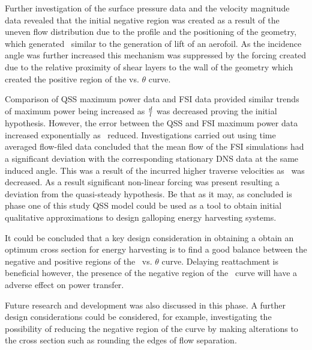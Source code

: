 Further investigation of the surface pressure data and the velocity magnitude data revealed that the initial negative region was created as a result of the uneven flow distribution due to the profile and the positioning of the geometry, which generated \cy\ similar to the generation of lift of an aerofoil. As the incidence angle was further increased this mechanism was suppressed by the forcing created due to the relative proximity of shear layers to the wall of the geometry which created the positive region of the \cy vs. $\theta$ curve. 

Comparison of QSS maximum power data and FSI data provided similar trends of maximum power being increased as $\frac{d}{l}$ was decreased proving the initial hypothesis. However, the error between the QSS and FSI maximum power data increased exponentially as \ratio\ reduced. Investigations carried out using time averaged flow-filed data concluded that the mean flow of the FSI simulations had a significant deviation with the corresponding stationary DNS data at the same induced angle. This was a result of the incurred higher  traverse velocities as \ratio\ was decreased. As a result significant non-linear forcing was present resulting a deviation from the quasi-steady hypothesis. Be that as it may, as concluded is phase one of this study QSS model could be used as a tool to obtain initial qualitative approximations to design galloping energy harvesting systems. 

It could be concluded that a key design consideration in obtaining a obtain an optimum cross section for energy harvesting is to find a good balance between the negative and positive regions of the \cy\ vs. $\theta$ curve. Delaying reattachment is beneficial however, the presence of the negative region of the \cy\ curve will have a adverse effect on power transfer. 

Future research and development was also discussed in this phase. A further design considerations could be considered, for example, investigating the possibility of reducing the negative region of the \cy curve by making alterations to the cross section such as rounding the edges of flow separation.





  

